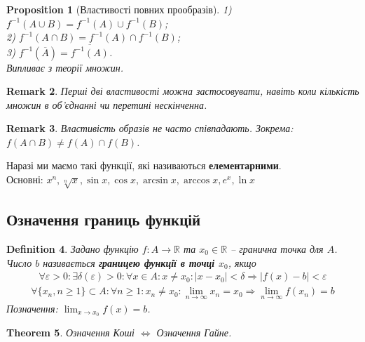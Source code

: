 \documentclass[a4paper, 14pt]{article}
\theoremstyle{theoremdd}
\newtheorem{theorem}{Theorem}[subsection]
\theoremstyle{theoremdd}
\newtheorem{definition}[theorem]{Definition}
\theoremstyle{theoremdd}
\theoremstyle{theoremdd}
\theoremstyle{theoremdd}
\newtheorem{proposition}[theorem]{Proposition}
\theoremstyle{theoremdd}
\newtheorem{remark}[theorem]{Remark}
\theoremstyle{theoremdd}
\theoremstyle{theoremdd}
\begin{document}
	\begin{proposition}[Властивості повних прообразів]
	1) $f^{-1}(A \cup B) = f^{-1}(A) \cup f^{-1}(B)$;\\
	2) $f^{-1}(A \cap B) = f^{-1}(A) \cap f^{-1}(B)$;\\
	3) $f^{-1}(\overline{A}) = \overline{f^{-1}(A)}$.\\
	\textit{Випливає з теорії множин.}
	\end{proposition}
	
	\begin{remark}
	Перші дві властивості можна застосовувати, навіть коли кількість множин в об'єднанні чи перетині нескінченна.
	\end{remark}
	
	\begin{remark}
	Властивість образів не часто співпадають. Зокрема: $f(A \cap B) \neq f(A) \cap f(B)$.
	\end{remark}
	
	Наразі ми маємо такі функції, які називаються \textbf{елементарними}.\\ Основні: $x^n, \sqrt[n]{x}, \sin x, \cos x, \arcsin x, \arccos x, e^x, \ln x$
	\fi
	
	\subsection{Означення границь функцій}
	\begin{definition}
	Задано функцію $f \colon A \to \mathbb{R}$ та $x_0 \in \mathbb{R}$ -- гранична точка для $A$.\\
	Число $b$ називається \textbf{границею функції в точці $x_0$}, якщо
	\begin{align*}
	\forall \varepsilon > 0: \exists \delta(\varepsilon) > 0: \forall x \in A: x \neq x_0: |x-x_0|<\delta \Rightarrow |f(x)-b|<\varepsilon \tag*{означення Коші}
	\end{align*}
	\begin{align*}
	\forall \{x_n, n \geq 1\}\subset A: \forall n \geq 1: x_n \neq x_0: \lim_{n \to \infty} x_n = x_0 \Rightarrow \lim_{n \to \infty} f(x_n) = b \tag*{означення Гайне}
	\end{align*}
	Позначення: $\displaystyle \lim_{x \to x_0} f(x) = b$.
	\end{definition}
	
	\begin{theorem}
	Означення Коші $\iff$ Означення Гайне.
	\end{theorem}
	
\end{document}
